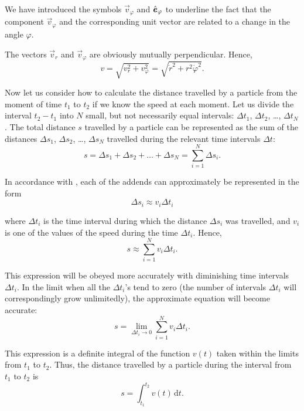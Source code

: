 \noindent
We have introduced the symbols $\vec{v}_{\varphi}$ and $\hat{\boldsymbol{e}}_{\varphi}$ to underline the fact that the component $\vec{v}_{\varphi}$ and the corresponding unit vector are related to a change in the angle $\varphi$.

The vectors $\vec{v}_r$ and $\vec{v}_{\varphi}$ are obviously mutually perpendicular. Hence,
\begin{equation}\label{eq:1_72}
v = \sqrt{v_r^2 + v_{\varphi}^2} = \sqrt{\dot{r}^2 + r^2\dot{\varphi}^2}.
\end{equation}

Now let us consider how to calculate the distance travelled by a particle from the moment of time $t_1$ to $t_2$ if we know the speed at each moment. Let us divide the interval $t_2-t_1$ into $N$ small, but not necessarily equal intervals: $\Delta t_1$, $\Delta t_2$, \ldots, $\Delta t_N$. The total distance $s$ travelled by a particle can be represented as the sum of the distances $\Delta s_1$, $\Delta s_2$, \ldots, $\Delta s_N$ travelled during the relevant time intervals $\Delta t$:
\begin{equation*}
s = \Delta s_1 + \Delta s_2 + \ldots + \Delta s_N = \sum_{i=1}^{N} \Delta s_i.
\end{equation*}

\noindent
In accordance with , each of the addends can approximately be represented in the form
\begin{equation*}
\Delta s_i \approx v_i \Delta t_i
\end{equation*}

\noindent
where $\Delta t_i$ is the time interval during which the distance $\Delta s_i$ was travelled, and $v_i$ is one of the values of the speed during the time $\Delta t_i$. Hence,
\begin{equation}\label{eq:1_73}
s \approx \sum_{i=1}^{N} v_i \Delta t_i.
\end{equation}

\noindent
This expression will be obeyed more accurately with diminishing time intervals $\Delta t_i$. In the limit when all the $\Delta t_i$'s tend to zero (the number of intervals $\Delta t_i$ will correspondingly grow unlimitedly), the approximate equation will become accurate:
\begin{equation*}
s = \lim_{\Delta t_i\to 0} \sum_{i=1}^{N} v_i \Delta t_i.
\end{equation*}

This expression is a definite integral of the function $v(t)$ taken within the limits from $t_1$ to $t_2$. Thus, the distance travelled by a particle during the interval from $t_1$ to $t_2$ is
\begin{equation}\label{eq:1_74}
s = \int_{t_1}^{t_2} v(t)\,\mathrm{d}t.
\end{equation}

